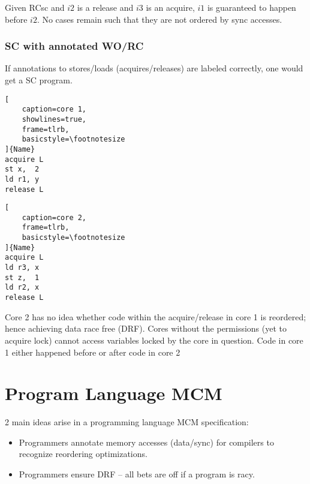 \documentclass{article}
\begin{document}
\begin{multicols*}{2}
\noindent\newline
Given RCsc and $i2$ is a release and $i3$ is an acquire, $i1$ is guaranteed to happen before $i2$. No cases remain such that they are not ordered by sync accesses.

\subsubsection{SC with annotated WO/RC}
If annotations to stores/loads (acquires/releases) are labeled correctly, one would get a SC program.

\noindent\begin{minipage}{.2\textwidth}
\captionsetup{labelformat=empty}
\begin{lstlisting}[
    caption=core 1,
    showlines=true,
    frame=tlrb, 
    basicstyle=\footnotesize
]{Name}
acquire L
st x,  2
ld r1, y
release L

\end{lstlisting}
\end{minipage}\hfill
\begin{minipage}{.24\textwidth}
\captionsetup{labelformat=empty}
\begin{lstlisting}[
    caption=core 2,
    frame=tlrb,
    basicstyle=\footnotesize
]{Name}
acquire L
ld r3, x
st z,  1
ld r2, x
release L
\end{lstlisting}
\end{minipage}

\noindent\newline
Core 2 has no idea whether code within the acquire/release in core 1 is reordered; hence achieving data race free (DRF). Cores without the permissions (yet to acquire lock) cannot access variables locked by the core in question. Code in core 1 either happened before or after code in core 2

\section{Program Language MCM}
2 main ideas arise in a programming language MCM specification:
\begin{itemize}
    \item Programmers annotate memory accesses (data/sync) for compilers to recognize reordering optimizations.
    \item Programmers ensure DRF -- all bets are off if a program is racy.
\end{itemize}


\end{multicols*}
\end{document}
